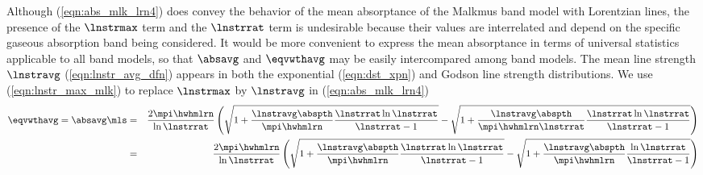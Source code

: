 \documentclass[12pt]{article}
\begin{document}
Although (\ref{eqn:abs_mlk_lrn4}) does convey the behavior of
the mean absorptance of the Malkmus band model with Lorentzian lines, 
the presence of the $\lnstrmax$ term and the $\lnstrrat$ term is
undesirable because their values are interrelated and depend 
on the specific gaseous absorption band being considered. 
It would be more convenient to express the mean absorptance
in terms of universal statistics applicable to all band models,
so that $\absavg$ and $\eqvwthavg$ may be easily intercompared among
band models.
The mean line strength $\lnstravg$ (\ref{eqn:lnstr_avg_dfn}) appears
in both the exponential (\ref{eqn:dst_xpn}) and Godson line strength
distributions.
We use (\ref{eqn:lnstr_max_mlk}) to replace $\lnstrmax$ by $\lnstravg$
in (\ref{eqn:abs_mlk_lrn4})  
\begin{eqnarray}
\eqvwthavg = \absavg \mls 
& = & 
\frac{2 \mpi \hwhmlrn}{\ln \lnstrrat} 
\left( 
\sqrt{1 + \frac{\lnstravg \abspth}{\mpi \hwhmlrn} 
\frac{\lnstrrat \ln \lnstrrat}{\lnstrrat - 1}} -
\sqrt{1 + \frac{\lnstravg \abspth}{\mpi \hwhmlrn \lnstrrat}
\frac{\lnstrrat \ln \lnstrrat}{\lnstrrat - 1}}
\right) \nonumber \\
& = & 
\frac{2 \mpi \hwhmlrn}{\ln \lnstrrat} 
\left( 
\sqrt{1 + \frac{\lnstravg \abspth}{\mpi \hwhmlrn} 
\frac{\lnstrrat \ln \lnstrrat}{\lnstrrat - 1}} -
\sqrt{1 + \frac{\lnstravg \abspth}{\mpi \hwhmlrn}
\frac{\ln \lnstrrat}{\lnstrrat - 1}}
\right)
\label{eqn:abs_mlk_lrn}
\end{eqnarray}
\end{document}
